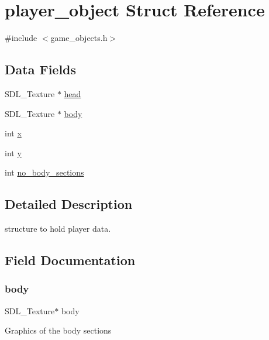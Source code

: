 \hypertarget{structplayer__object}{}\section{player\+\_\+object Struct Reference}
\label{structplayer__object}


{\ttfamily \#include $<$game\+\_\+objects.\+h$>$}

\subsection*{Data Fields}
\begin{DoxyCompactItemize}
\item 
S\+D\+L\+\_\+\+Texture $\ast$ \mbox{\hyperlink{structplayer__object_a156af47b8be9c09879c063ad443877a5}{head}}
\item 
S\+D\+L\+\_\+\+Texture $\ast$ \mbox{\hyperlink{structplayer__object_a78cbc3f4a306ce98ce51b731549a5cf0}{body}}
\item 
int \mbox{\hyperlink{structplayer__object_a6150e0515f7202e2fb518f7206ed97dc}{x}}
\item 
int \mbox{\hyperlink{structplayer__object_a0a2f84ed7838f07779ae24c5a9086d33}{y}}
\item 
int \mbox{\hyperlink{structplayer__object_a06948963e49fd8de64945937788fc3f8}{no\+\_\+body\+\_\+sections}}
\end{DoxyCompactItemize}


\subsection{Detailed Description}
structure to hold player data. 

\subsection{Field Documentation}
\mbox{\label{structplayer__object_a78cbc3f4a306ce98ce51b731549a5cf0}} 
\subsubsection{\texorpdfstring{body}{body}}
{\footnotesize\ttfamily S\+D\+L\+\_\+\+Texture$\ast$ body}

Graphics of the body sections \mbox{\label{structplayer__object_a156af47b8be9c09879c063ad443877a5}} 
